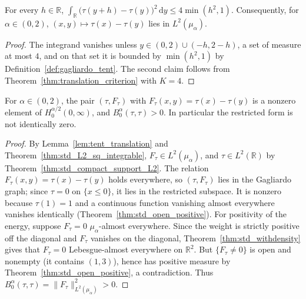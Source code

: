 \begin{lemma}\label{lem:tent_translation}
\leanok
For every $h \in \mathbb{R}$, $\int_{\mathbb{R}} \bigl(\tau(y + h) - \tau(y)\bigr)^2 \, \mathrm{d}y \le 4 \min(h^2, 1)$. Consequently, for $\alpha \in (0, 2)$, $(x, y) \mapsto \tau(x) - \tau(y)$ lies in $L^2(\mu_\alpha)$.
\end{lemma}

\begin{proof}
\leanok
The integrand vanishes unless $y \in (0, 2) \cup (-h, 2 - h)$, a set of measure at most $4$, and on that set it is bounded by $\min(h^2, 1)$ by Definition~\ref{def:gagliardo_tent}. The second claim follows from Theorem~\ref{thm:translation_criterion} with $K = 4$.
\end{proof}

\begin{theorem}\label{thm:tent_witness}
\leanok
For $\alpha \in (0, 2)$, the pair $(\tau, F_\tau)$ with $F_\tau(x, y) = \tau(x) - \tau(y)$ is a nonzero element of $H^{\alpha/2}_0(0, \infty)$, and $B^\alpha_0(\tau, \tau) > 0$. In particular the restricted form is not identically zero.
\end{theorem}

\begin{proof}
\leanok
By Lemma~\ref{lem:tent_translation} and Theorem~\ref{thm:std_L2_sq_integrable}, $F_\tau \in L^2(\mu_\alpha)$, and $\tau \in L^2(\mathbb{R})$ by Theorem~\ref{thm:std_compact_support_L2}. The relation $F_\tau(x, y) = \tau(x) - \tau(y)$ holds everywhere, so $(\tau, F_\tau)$ lies in the Gagliardo graph; since $\tau = 0$ on $\{x \le 0\}$, it lies in the restricted subspace. It is nonzero because $\tau(1) = 1$ and a continuous function vanishing almost everywhere vanishes identically (Theorem~\ref{thm:std_open_positive}). For positivity of the energy, suppose $F_\tau = 0$ $\mu_\alpha$-almost everywhere. Since the weight is strictly positive off the diagonal and $F_\tau$ vanishes on the diagonal, Theorem~\ref{thm:std_withdensity} gives that $F_\tau = 0$ Lebesgue-almost everywhere on $\mathbb{R}^2$. But $\{F_\tau \ne 0\}$ is open and nonempty (it contains $(1, 3)$), hence has positive measure by Theorem~\ref{thm:std_open_positive}, a contradiction. Thus $B^\alpha_0(\tau, \tau) = \lVert F_\tau \rVert^2_{L^2(\mu_\alpha)} > 0$.
\end{proof}
